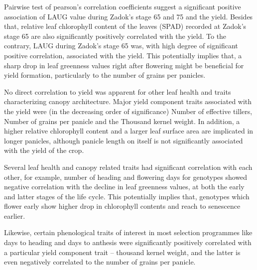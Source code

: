 \documentclass[12pt,oneside]{dukestatscithesis} %
\theoremstyle{definition}
\theoremstyle{definition}
\theoremstyle{definition}
\theoremstyle{remark}
\begin{document}
Pairwise test of pearson's correlation coefficients suggest a
significant positive association of LAUG value during Zadok's stage 65
and 75 and the yield. Besides that, relative leaf chlorophyll content of
the leaves (SPAD) recorded at Zadok's stage 65 are also significantly
positively correlated with the yield. To the contrary, LAUG during
Zadok's stage 65 was, with high degree of significant positive
correlation, associated with the yield. This potentially implies that, a
sharp drop in leaf greenness values right after flowering might be
beneficial for yield formation, particularly to the number of grains per
panicles.

No direct correlation to yield was apparent for other leaf health and
traits characterizing canopy architecture. Major yield component traits
associated with the yield were (in the decreasing order of significance)
Number of effective tillers, Number of grains per panicle and the
Thousand kernel weight. In addition, a higher relative chlorophyll
content and a larger leaf surface area are implicated in longer
panicles, although panicle length on itself is not significantly
associated with the yield of the crop.

Several leaf health and canopy related traits had significant
correlation with each other, for example, number of heading and
flowering days for genotypes showed negative correlation with the
decline in leaf greenness values, at both the early and latter stages of
the life cycle. This potentially implies that, genotypes which flower
early show higher drop in chlorophyll contents and reach to senescence
earlier.

Likewise, certain phenological traits of interest in most selection
programmes like days to heading and days to anthesis were significantly
positively correlated with a particular yield component trait --
thousand kernel weight, and the latter is even negatively correlated to
the number of grains per panicle.
\end{document}
